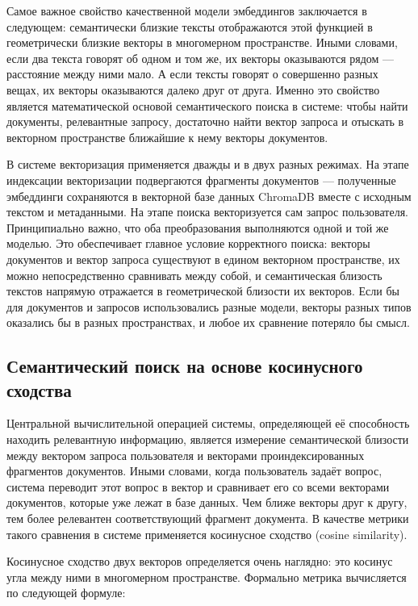 Самое важное свойство качественной модели эмбеддингов заключается в следующем: семантически близкие тексты отображаются этой функцией в геометрически близкие векторы в многомерном пространстве. Иными словами, если два текста говорят об одном и том же, их векторы оказываются рядом — расстояние между ними мало. А если тексты говорят о совершенно разных вещах, их векторы оказываются далеко друг от друга. Именно это свойство является математической основой семантического поиска в системе: чтобы найти документы, релевантные запросу, достаточно найти вектор запроса и отыскать в векторном пространстве ближайшие к нему векторы документов.

В системе векторизация применяется дважды и в двух разных режимах. На этапе индексации векторизации подвергаются фрагменты документов — полученные эмбеддинги сохраняются в векторной базе данных ChromaDB вместе с исходным текстом и метаданными. На этапе поиска векторизуется сам запрос пользователя. Принципиально важно, что оба преобразования выполняются одной и той же моделью. Это обеспечивает главное условие корректного поиска: векторы документов и вектор запроса существуют в едином векторном пространстве, их можно непосредственно сравнивать между собой, и семантическая близость текстов напрямую отражается в геометрической близости их векторов. Если бы для документов и запросов использовались разные модели, векторы разных типов оказались бы в разных пространствах, и любое их сравнение потеряло бы смысл.

\subsection{Семантический поиск на основе косинусного сходства}

Центральной вычислительной операцией системы, определяющей её способность находить релевантную информацию, является измерение семантической близости между вектором запроса пользователя и векторами проиндексированных фрагментов документов. Иными словами, когда пользователь задаёт вопрос, система переводит этот вопрос в вектор и сравнивает его со всеми векторами документов, которые уже лежат в базе данных. Чем ближе векторы друг к другу, тем более релевантен соответствующий фрагмент документа. В качестве метрики такого сравнения в системе применяется косинусное сходство (cosine similarity).

Косинусное сходство двух векторов определяется очень наглядно: это косинус угла между ними в многомерном пространстве. Формально метрика вычисляется по следующей формуле:


